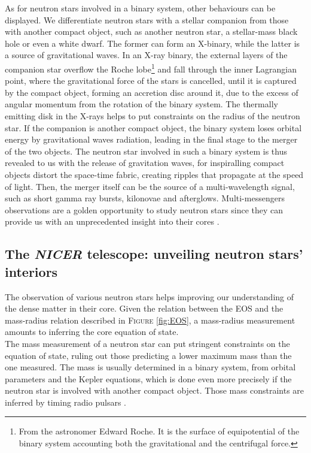 \documentclass[a4paper, twoside, 12pt]{article}
\numberwithin{equation}{section}
\begin{document}
As for neutron stars involved in a binary system, other behaviours can be displayed. We differentiate neutron stars with a stellar companion from those with another compact object, such as another neutron star, a stellar-mass black hole or even a white dwarf.  The former can form an X-binary, while the latter is a source of gravitational waves. In an X-ray binary, the external layers of the companion star overflow the Roche lobe\footnote{From the astronomer Edward Roche. It is the surface of equipotential of the binary system accounting both the gravitational and the centrifugal force.}  and fall through the inner Lagrangian point, where the gravitational force of the stars is cancelled, until it is captured by the compact object, forming an accretion disc around it, due to the excess of angular momentum from the rotation of the binary system. The thermally emitting disk in the X-rays helps to put constraints on the radius of the neutron star. If the companion is another compact object, the binary system loses orbital energy by gravitational waves radiation, leading in the final stage to the merger of the two objects. The neutron star involved in such a binary system is thus revealed to us with the release of gravitation waves, for inspiralling compact objects distort the space-time fabric, creating ripples that propagate at the speed of light. Then, the merger itself can be the source of a multi-wavelength signal, such as short gamma ray bursts,  kilonovae and  afterglows. 
Multi-messengers observations are a golden opportunity to study neutron stars since they can provide us with an unprecedented insight into their cores\cite{GW_constrains} \cite{MultiMessenger_denseMatter}. \\

\subsection{The {\itshape{NICER}} telescope: unveiling neutron stars' interiors}
\label{subsec: NICER}
\hspace{\parindent}	 The observation of various neutron stars helps improving our understanding of the dense matter in their core. Given the relation between the EOS and the mass-radius relation described in F\textsc{igure} \ref{fig:EOS}, a mass-radius measurement amounts to inferring the core equation of state.  \\

The mass measurement of a neutron star can put stringent constraints on the equation of state, ruling out those predicting a lower maximum mass than the one measured. The mass is usually determined in a binary system, from orbital parameters and the Kepler equations,  which is done even more precisely if the neutron star is involved with another compact object. Those mass constraints are inferred by timing radio pulsars \cite{Radio_Timing_Mass}.\\ 
\end{document}
